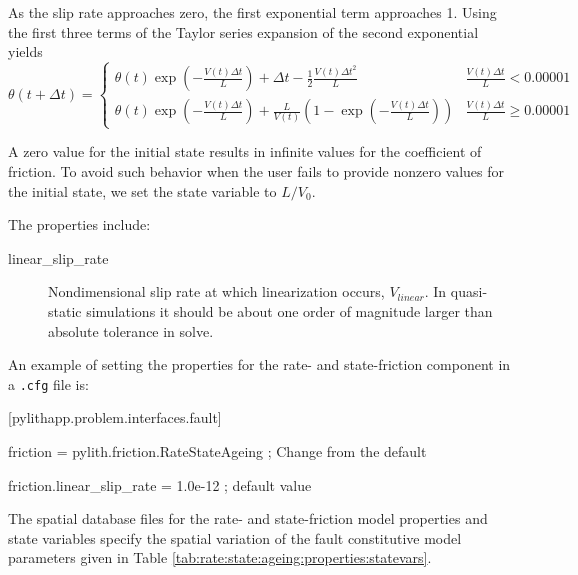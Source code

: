 As the slip rate approaches zero, the first exponential term approaches
1. Using the first three terms of the Taylor series expansion of the
second exponential yields
\begin{equation}
\theta(t+\Delta t)=\begin{cases}
\theta(t)\exp\left(-\frac{V(t)\Delta t}{L}\right)+\Delta t-\frac{1}{2}\frac{V(t)\Delta t^{2}}{L} & \frac{V(t)\Delta t}{L}<0.00001\\
\theta(t)\exp\left(-\frac{V(t)\Delta t}{L}\right)+\frac{L}{V(t)}\left(1-\exp\left(-\frac{V(t)\Delta t}{L}\right)\right) & \frac{V(t)\Delta t}{L}\ge0.00001
\end{cases}
\end{equation}

A zero value for the initial state results in infinite values for
the coefficient of friction. To avoid such behavior when the user
fails to provide nonzero values for the initial state, we set the
state variable to $L/V_{0}$.

The properties include:
\begin{description}
\item [{linear\_slip\_rate}] Nondimensional slip rate at which linearization
occurs, $V_{linear}$. In quasi-static simulations it should be about
one order of magnitude larger than absolute tolerance in solve.
\end{description}
An example of setting the properties for the rate- and state-friction
component in a \texttt{.cfg} file is:
\begin{lyxcode}
{\footnotesize{}[pylithapp.problem.interfaces.fault]}{\footnotesize \par}

{\footnotesize{}friction = pylith.friction.RateStateAgeing ; Change from the default}{\footnotesize \par}

{\footnotesize{}friction.linear\_slip\_rate = 1.0e-12 ; default value}{\footnotesize \par}
\end{lyxcode}
The spatial database files for the rate- and state-friction model
properties and state variables specify the spatial variation of the
fault constitutive model parameters given in Table \vref{tab:rate:state:ageing:properties:statevars}.

